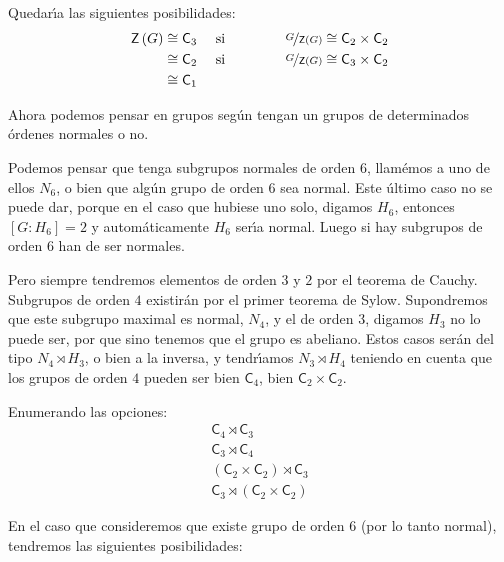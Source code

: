 \documentclass[final,12pt,a4paper,twoside,fleqn]{extbook}
\newcommand{\grclass}[1]{\ensuremath{\mathsf{#1}}}
\newcommand{\cyclicgr}[1]{\ensuremath{{\grclass{C}}_{#1}}}
\theoremstyle{definition}
\theoremstyle{remark}
\begin{document}
 Quedar{\'{\i}}a las siguientes posibilidades:
\begin{align}
\mathsf{Z}\left(G\right) &                  \cong                   \cyclicgr{3} &\text{ si }\quad\quad\quad\quad&
\nicefrac{G}{\mathsf{Z}\left(G\right)}                  \cong                   \cyclicgr{2}                  \times                   \cyclicgr{2}\\
&                  \cong                   \cyclicgr{2}  &\text{ si }\quad\quad\quad\quad& \nicefrac{G}{\mathsf{Z}\left(G\right)}
                  \cong                   \cyclicgr{3}                  \times                   \cyclicgr{2}\\
&                  \cong                   \cyclicgr{1}&&
\end{align}

Ahora podemos pensar en grupos seg\'un tengan un grupos de determinados \'ordenes normales o no.

Podemos pensar que tenga subgrupos normales de orden $6$, llam\'emos a uno de ellos $N_6$, o bien que alg\'un grupo de
orden $6$ sea normal. Este \'ultimo caso no se puede dar, porque en el caso que hubiese uno solo, digamos $H_6$, entonces $[G:H_6]=2$ y autom\'aticamente $H_6$ ser{\'{\i}}a normal. Luego si hay subgrupos de orden $6$ han de ser normales.

Pero siempre tendremos elementos de orden $3$ y $2$ por el teorema de Cauchy. Subgrupos de orden $4$ existir\'an por el primer teorema de Sylow. Supondremos que este subgrupo maximal es normal, $N_4$, y el de orden $3$, digamos $H_3$ no lo puede ser, por que sino tenemos que el grupo es abeliano. Estos casos ser\'an del tipo $N_4\rtimes H_3$, o bien a la inversa, y tendr{\'{\i}}amos $N_3\rtimes H_4$ teniendo en cuenta que los grupos de orden $4$ pueden ser bien $\cyclicgr{4}$, bien $\cyclicgr{2}                   \times                   \cyclicgr{2}$.

Enumerando las opciones:
\begin{align}
\cyclicgr{4}\rtimes \cyclicgr{3}\\
\cyclicgr{3}\rtimes \cyclicgr{4}\\
\left(\cyclicgr{2}                  \times                  \cyclicgr{2}\right)\rtimes \cyclicgr{3}\\
\cyclicgr{3}\rtimes \left(\cyclicgr{2}                  \times                  \cyclicgr{2}\right)
\end{align}

En el caso que consideremos que existe grupo de orden $6$ (por lo tanto normal), tendremos las siguientes posibilidades:
\end{document}
